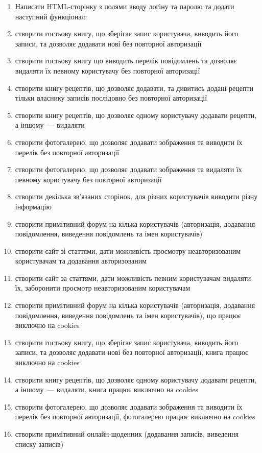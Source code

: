 \begin{enumerate}
\item[]Написати HTML-сторінку з полями вводу логіну та паролю та додати наступний функціонал:
\item створити гостьову книгу, що зберігає запис користувача, виводить його записи, та дозволяє додавати нові без повторної авторизації
\item створити гостьову книгу що виводить перелік повідомлень та дозволяє видаляти їх певному користувачу без повторної авторизації
\item створити книгу рецептів, що дозволяє додавати, та дивитись додані рецепти тільки власнику записів послідовно без повторної авторизації
\item створити книгу рецептів, що дозволяє одному користувачу додавати рецепти, а іншому~--- видаляти
\item створити фотогалерею, що дозволяє додавати зображення та виводити їх перелік без повторної авторизації
\item створити фотогалерею, що дозволяє додавати зображення та видаляти їх певному користувачу без повторної авторизації
\item створити декілька зв'язаних сторінок, для різних користувачів виводити різну інформацію
\item створити примітивний форум на кілька користувачів (авторизація, додавання повідомлення, виведення повідомлень та імен користувачів)
\item створити сайт зі статтями, дати можливість просмотру неавторизованим користувачам та додавання авторизованим
\item створити сайт за статтями, дати можливість певним користувачам видаляти їх, заборонити просмотр неавторизованим користувачам
\item створити примітивний форум на кілька користувачів (авторизація, додавання повідомлення, виведення повідомлень та імен користувачів), що працює виключно на cookies
\item створити гостьову книгу, що зберігає запис користувача, виводить його записи, та дозволяє додавати нові без повторної авторизації, книга працює виключно на cookies
\item створити книгу рецептів, що дозволяє одному користувачу додавати рецепти, а іншому~--- видаляти, книга працює виключно на cookies
\item створити фотогалерею, що дозволяє додавати зображення та виводити їх перелік без повторної авторизації, фотогалерею працює виключно на cookies
\item створити примітивний онлайн-щоденник (додавання записів, виведення списку записів)

\end{enumerate}
